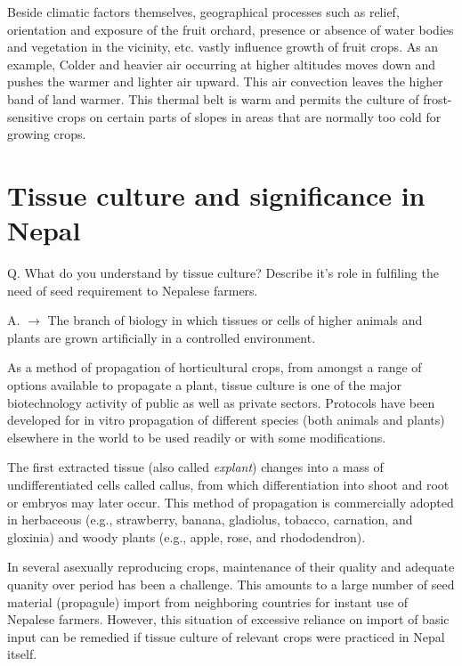 \documentclass[
]{book}
\begin{document}
Beside climatic factors themselves, geographical processes such as relief, orientation and exposure of the fruit orchard, presence or absence of water bodies and vegetation in the vicinity, etc. vastly influence growth of fruit crops. As an example, Colder and heavier air occurring at higher altitudes moves down and pushes the warmer and lighter air upward. This air convection leaves the higher band of land warmer. This thermal belt is warm and permits the culture of frost-sensitive crops on certain parts of slopes in areas that are normally too cold for growing crops.

\hypertarget{tissue-culture-and-significance-in-nepal}{%
\section{Tissue culture and significance in Nepal}\label{tissue-culture-and-significance-in-nepal}}

Q. What do you understand by tissue culture? Describe it's role in fulfiling the need of seed requirement to Nepalese farmers.

A. \(\longrightarrow\) The branch of biology in which tissues or cells of higher animals and plants are grown artificially in a controlled environment.

As a method of propagation of horticultural crops, from amongst a range of options available to propagate a plant, tissue culture is one of the major biotechnology activity of public as well as private sectors. Protocols have been developed for in vitro propagation of different species (both animals and plants) elsewhere in the world to be used readily or with some modifications.

The first extracted tissue (also called \emph{explant}) changes into a mass of undifferentiated cells called callus, from which differentiation into shoot and root or embryos may later occur. This method of propagation is commercially adopted in herbaceous (e.g., strawberry, banana, gladiolus, tobacco, carnation, and gloxinia) and woody plants (e.g., apple, rose, and rhododendron).

In several asexually reproducing crops, maintenance of their quality and adequate quanity over period has been a challenge. This amounts to a large number of seed material (propagule) import from neighboring countries for instant use of Nepalese farmers. However, this situation of excessive reliance on import of basic input can be remedied if tissue culture of relevant crops were practiced in Nepal itself.
\end{document}
